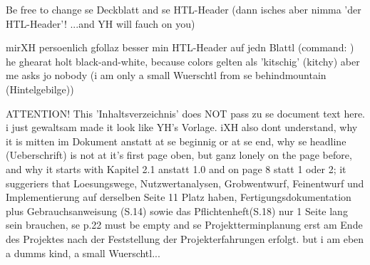 \documentclass[12pt,a4paper]{article}
\begin{document}
{	Be free to change se Deckblatt
	and se HTL-Header (dann isches aber nimma 'der HTL-Header'! ...and YH will fauch on you)

	mirXH persoenlich gfollaz besser min HTL-Header auf jedn Blattl
	(command: \lhead{\HtlHeader})
	he ghearat holt black-and-white, because colors gelten als 'kitschig' (kitchy)
	aber me asks jo nobody (i am only a small Wuerschtl from se behindmountain (Hintelgebilge))

	ATTENTION!
	This 'Inhaltsverzeichnis'
	does NOT pass zu se document text here.
	i just gewaltsam made it look like YH's Vorlage.
	iXH also dont understand,
	why it is mitten im Dokument anstatt at se beginnig or at se end,
	why se headline (Ueberschrift) is not at it's first page oben,
	but ganz lonely on the page before,
	and why it starts with Kapitel 2.1 anstatt 1.0
	and on page 8 statt 1 oder 2;
	it suggeriers that Loesungswege, Nutzwertanalysen, Grobwentwurf, Feinentwurf
	und Implementierung auf derselben Seite 11 Platz haben,
	Fertigungsdokumentation plus Gebrauchsanweisung (S.14)
	sowie das Pflichtenheft(S.18) nur 1 Seite lang sein brauchen,
	se p.22 must be empty
	and se Projektterminplanung erst am Ende des Projektes nach der
	Feststellung der Projekterfahrungen erfolgt.
	but i am eben a dumms kind, a small Wuerschtl...


}%
\end{document}
